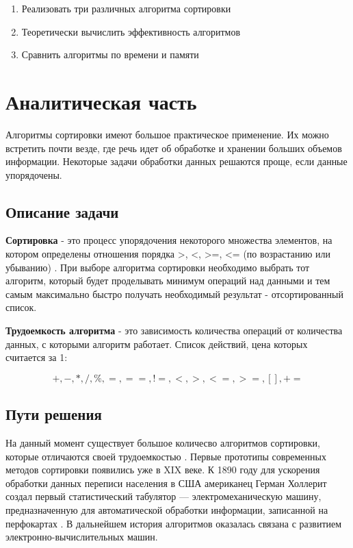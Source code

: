 \documentclass[a4paper,12pt]{article}
\begin{document}
\begin{enumerate}
    \item Реализовать три различных алгоритма сортировки
    \item Теоретически вычислить эффективность алгоритмов
    \item Сравнить алгоритмы по времени и памяти
\end{enumerate}

\newpage
\section{Аналитическая часть}

Алгоритмы сортировки имеют большое практическое применение. Их можно встретить почти везде,
где речь идет об обработке и хранении больших объемов информации. Некоторые задачи обработки
данных решаются проще, если данные упорядочены.

\subsection{Описание задачи}

\textbf{Сортировка} - это процесс упорядочения некоторого множества элементов,
на котором определены отношения порядка >, <, >=, <= (по возрастанию или убыванию) \cite{pav}.
При выборе алгоритма сортировки необходимо выбрать тот алгоритм, который будет проделывать
минимум операций над данными и тем самым максимально быстро получать необходимый результат -
отсортированный список.

\textbf{Трудоемкость алгоритма} - это зависимость количества операций от количества
данных, с которыми алгоритм работает. Список действий, цена которых считается за 1:

$$
+, -, *, /, \%, =, ==, !=, <, >, <=, >=, [], +=
$$

\subsection{Пути решения}

На данный момент существует большое количесво алгоритмов сортировки, которые отличаются
своей трудоемкостью \cite{knuth}. Первые прототипы современных методов сортировки появились уже
в XIX веке. К 1890 году для ускорения обработки данных переписи населения в США американец
Герман Холлерит создал первый статистический табулятор — электромеханическую машину,
предназначенную для автоматической обработки информации, записанной на перфокартах
\cite{eniac}.
В дальнейшем история алгоритмов оказалась связана с развитием электронно-вычислительных машин.
\end{document}
